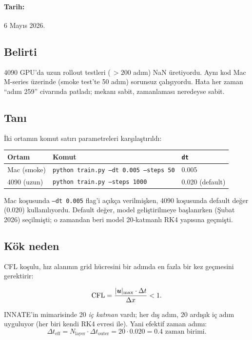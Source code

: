 \paragraph{Tarih:} 6 Mayıs 2026.

\subsection*{Belirti}

4090 GPU'da uzun rollout testleri (\,$> 200$ adım) NaN üretiyordu. Aynı kod Mac M-series üzerinde (smoke test'te 50 adım) sorunsuz çalışıyordu. Hata her zaman ``adım 259'' civarında patladı; mekanı sabit, zamanlaması neredeyse sabit.

\subsection*{Tanı}

İki ortamın komut satırı parametreleri karşılaştırıldı:

\begin{table}[H]
\centering
\begin{tabular}{lll}
\toprule
Ortam & Komut & \texttt{dt} \\
\midrule
Mac (smoke)   & \texttt{python train.py --dt 0.005 --steps 50}    & 0.005 \\
4090 (uzun)   & \texttt{python train.py --steps 1000}              & 0.020 (default) \\
\bottomrule
\end{tabular}
\end{table}

Mac koşusunda \texttt{--dt 0.005} flag'i açıkça verilmişken, 4090 koşusunda default değer ($0.020$) kullanılıyordu. Default değer, model geliştirilmeye başlanırken (Şubat 2026) seçilmişti; o zamandan beri model 20-katmanlı RK4 yapısına geçmişti.

\subsection*{Kök neden}

CFL koşulu, hız alanının grid hücresini bir adımda en fazla bir kez geçmesini gerektirir:

\begin{equation}
    \mathrm{CFL} = \frac{|\bm{u}|_{\max} \cdot \Delta t}{\Delta x} < 1.
    \label{eq:cfl}
\end{equation}

INNATE'in mimarisinde 20 \textit{iç katman} vardı; her dış adım, $20$ ardışık iç adım uyguluyor (her biri kendi RK4 evresi ile). Yani efektif zaman adımı:
\begin{equation}
    \Delta t_{\text{eff}} = N_{\text{layer}} \cdot \Delta t_{\text{outer}} = 20 \cdot 0.020 = 0.4 \text{ zaman birimi.}
\end{equation}

